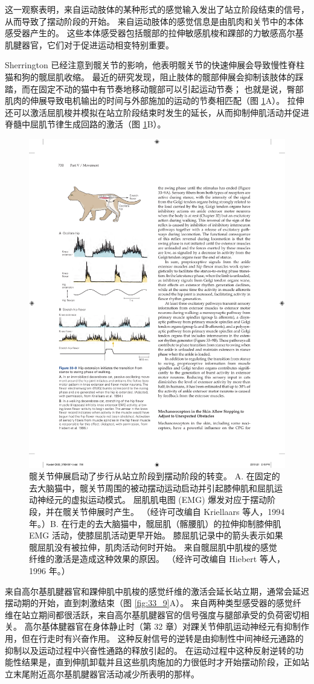 这一观察表明，来自运动肢体的某种形式的感觉输入发出了站立阶段结束的信号，从而导致了摆动阶段的开始。 来自运动肢体的感觉信息是由肌肉和关节中的本体感受器产生的。 这些本体感受器包括髋部的拉伸敏感肌梭和踝部的力敏感高尔基肌腱器官，它们对于促进运动相变特别重要。

Sherrington 已经注意到髋关节的影响，他表明髋关节的快速伸展会导致慢性脊柱猫和狗的髋屈肌收缩。 
最近的研究发现，阻止肢体的髋部伸展会抑制该肢体的踩踏，而在固定不动的猫中有节奏地移动髋部可以引起运动节奏； 也就是说，臀部肌肉的伸展导致电机输出的时间与外部施加的运动的节奏相匹配（图 \ref{fig:33_8}A）。 
拉伸还可以激活屈肌梭并模拟在站立阶段结束时发生的延长，从而抑制伸肌活动并促进脊髓中屈肌节律生成回路的激活（图 \ref{fig:33_8}B）。

\begin{figure}[htbp]
	\centering
	\includegraphics[width=0.5\linewidth]{chap33/fig_33_8}
	\caption{髋关节伸展启动了步行从站立阶段到摆动阶段的转变。 A. 在固定的去大脑猫中，髋关节周围的被动摆动运动启动并引起膝伸肌和屈肌运动神经元的虚拟运动模式。 屈肌肌电图 (EMG) 爆发对应于摆动阶段，并在髋关节伸展时产生。 （经许可改编自 Kriellaars 等人，1994 年。）B. 在行走的去大脑猫中，髋屈肌（髂腰肌）的拉伸抑制膝伸肌 EMG 活动，使膝屈肌活动更早开始。 膝屈肌记录中的箭头表示如果髋屈肌没有被拉伸，肌肉活动何时开始。 来自髋屈肌中肌梭的感觉纤维的激活是造成这种效果的原因。 （经许可改编自 Hiebert 等人，1996 年。）}
	\label{fig:33_8}
\end{figure}

来自高尔基肌腱器官和踝伸肌中肌梭的感觉纤维的激活会延长站立期，通常会延迟摆动期的开始，直到刺激结束（图 \ref{fig:33_9}A）。 
来自两种类型感受器的感觉纤维在站立期间都很活跃，来自高尔基肌腱器官的信号强度与腿部承受的负荷密切相关。 高尔基体腱器官在身体静止时（第 32 章）对踝关节伸肌运动神经元有抑制作用，但在行走时有兴奋作用。 这种反射信号的逆转是由抑制性中间神经元通路的抑制以及运动过程中兴奋性通路的释放引起的。 在运动过程中这种反射逆转的功能性结果是，直到伸肌卸载并且这些肌肉施加的力很低时才开始摆动阶段，正如站立末尾附近高尔基肌腱器官活动减少所表明的那样。

